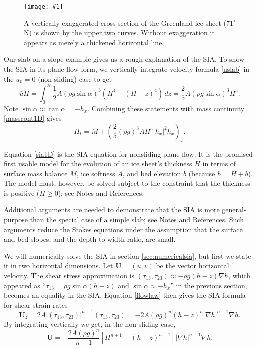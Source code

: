 \documentclass[letterpaper,final,12pt,reqno]{amsart}
\newcommand{\onefigsize}[3]{
\begin{figure}[ht]
\centering
\texttt{[image: \#1]}
\caption{#2}
\label{fig:#1}
\end{figure}}
\newcommand{\onefig}[2]{\onefigsize{#1}{#2}{3.0in}}
\begin{document}
\onefig{green-transect}{A vertically-exaggerated cross-section of the Greenland ice sheet ($71^\circ$ N) is shown by the upper two curves.  Without exaggeration it appears as merely a thickened horizontal line.}

Our slab-on-a-slope example gives us a rough explanation of the SIA.  To show the SIA in its plane-flow form, we vertically integrate velocity formula \eqref{uslab} in the $u_0=0$ (non-sliding) case to get
\begin{equation}
\bar u H = \int_0^H \frac{1}{2} A (\rho g \sin\alpha)^3  \left(H^4 - (H-z)^4\right)\,dz = \frac{2}{5} A (\rho g \sin\alpha)^3 H^5. \label{siaubar}
\end{equation}
Note $\sin \alpha \approx \tan\alpha = - h_x$.  Combining these statements with mass continuity \eqref{masscont1D} gives
\begin{equation}
  H_t = M + \left(\frac{2}{5} (\rho g)^3 A H^5 |h_x|^2 h_x\right)_x. \label{sia1D}
\end{equation}

Equation \eqref{sia1D} is the SIA equation for nonsliding plane flow.  It is the promised first usable model for the evolution of an ice sheet's thickness $H$ in terms of surface mass balance $M$, ice softness $A$, and bed elevation $b$ (because $h=H+b$).  The model must, however, be solved subject to the constraint that the thickness is positive ($H\ge 0$); see Notes and References.

Additional arguments are needed to demonstrate that the SIA is more general-purpose than the special case of a simple slab; see Notes and References.  Such arguments reduce the Stokes equations under the assumption that the surface and bed slopes, and the depth-to-width ratio, are small.

We will numerically solve the SIA in section \ref{sec:numericalsia}, but first we state it in two horizontal dimensions.  Let $\mathbf{U} = (u,v)$ be the vector horizontal velocity.  The shear stress approximation is $(\tau_{13},\tau_{23}) \approx - \rho g (h-z) \nabla h$, which appeared as ``$\tau_{13}= \rho g \sin \alpha (h-z)$ and $\sin \alpha \approx -h_x$'' in the previous section, becomes an equality in the SIA.  Equation \eqref{flowlaw} then gives the SIA formula for shear strain rates
\begin{equation*}
\mathbf{U}_z = 2 A |(\tau_{13},\tau_{23})|^{n-1} (\tau_{13},\tau_{23}) = - 2 A (\rho g)^n (h-z)^n |\nabla h|^{n-1} \nabla h.
\end{equation*}
By integrating vertically we get, in the non-sliding case,
\begin{equation}
\mathbf{U} = - \frac{2 A (\rho g)^n}{n+1} \left[H^{n+1} - (h-z)^{n+1}\right] |\nabla h|^{n-1} \nabla h.  \label{siavelocity}
\end{equation}
\end{document}
